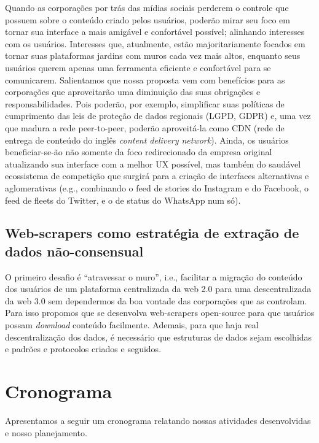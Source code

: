 Quando as corporações por trás das mídias sociais perderem o controle que possuem sobre o conteúdo criado pelos usuários, poderão mirar seu foco em tornar sua interface a mais amigável e confortável possível; alinhando  interesses com os  usuários.
Interesses que, atualmente, estão majoritariamente focados em tornar suas plataformas jardins com muros cada vez mais altos, enquanto seus usuários querem apenas uma ferramenta eficiente e confortável para se comunicarem.
Salientamos que nossa proposta vem com benefícios para as corporações que aproveitarão uma diminuição das suas obrigações e responsabilidades.
Pois poderão, por exemplo, simplificar suas políticas de cumprimento das leis de proteção de dados regionais (LGPD, GDPR) e, uma vez que madura a rede peer-to-peer, poderão aproveitá-la como CDN (rede de entrega de conteúdo do inglês \textit{content delivery network}).
Ainda, os usuários beneficiar-se-ão não somente da foco redirecionado da empresa original atualizando sua interface com a melhor UX possível, mas também do saudável ecossistema de competição que surgirá para a criação de interfaces alternativas e aglomerativas (e.g., combinando o feed de stories do Instagram e do Facebook, o feed de fleets do Twitter, e o de status do WhatsApp num só).

\section{Web-scrapers como estratégia de extração de dados não-consensual}

O primeiro desafio é ``atravessar o muro'', i.e., facilitar a migração do conteúdo dos usuários de um plataforma centralizada da web 2.0 para uma descentralizada da web 3.0 sem dependermos da boa vontade das corporações que as controlam.
Para isso propomos que se desenvolva web-scrapers open-source para que usuários possam \textit{download} conteúdo facilmente.
Ademais, para que haja real descentralização dos dados, é necessário que estruturas de dados sejam escolhidas e padrões e protocolos criados e seguidos. 

\section{}

\chapter{Cronograma}

Apresentamos a seguir um cronograma relatando nossas atividades desenvolvidas e nosso planejamento.

